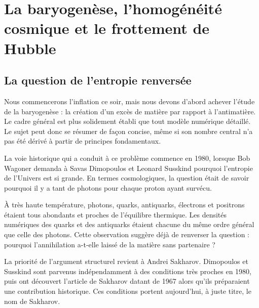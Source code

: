 \chapter{La baryogenèse, l’homogénéité cosmique et le frottement de Hubble}


\section{La question de l’entropie renversée}

Nous commencerons l’inflation ce soir, mais nous devons d’abord achever l’étude de la baryogenèse : la création d’un excès de matière par rapport à l’antimatière. Le cadre général est plus solidement établi que tout modèle numérique détaillé. Le sujet peut donc se résumer de façon concise, même si son nombre central n’a pas été dérivé à partir de principes fondamentaux.

La voie historique qui a conduit à ce problème commence en 1980, lorsque Bob Wagoner demanda à Savas Dimopoulos et Leonard Susskind pourquoi l’entropie de l’Univers est si grande. En termes cosmologiques, la question était de savoir pourquoi il y a tant de photons pour chaque proton ayant survécu.

À très haute température, photons, quarks, antiquarks, électrons et positrons étaient tous abondants et proches de l’équilibre thermique. Les densités numériques des quarks et des antiquarks étaient chacune du même ordre général que celle des photons. Cette observation suggère déjà de renverser la question : pourquoi l’annihilation a-t-elle laissé de la matière sans partenaire ?

La priorité de l’argument structurel revient à Andrei Sakharov. Dimopoulos et Susskind sont parvenus indépendamment à des conditions très proches en 1980, puis ont découvert l’article de Sakharov datant de 1967 alors qu’ils préparaient une contribution historique. Ces conditions portent aujourd’hui, à juste titre, le nom de Sakharov.

